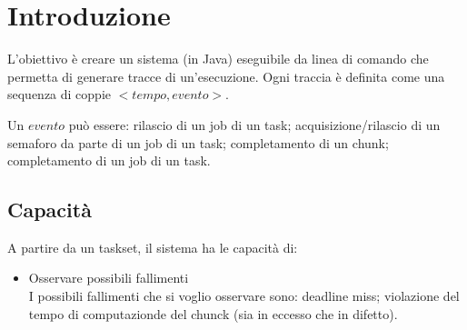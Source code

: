 \chapter{Introduzione}
L'obiettivo è creare un sistema (in Java) eseguibile da linea di comando che permetta di generare tracce di un'esecuzione. Ogni traccia è definita come una sequenza di coppie $<tempo, evento>$.

Un $evento$ può essere: rilascio di un job di un task; acquisizione/rilascio di un semaforo da parte di un job di un task; completamento di un chunk; completamento di un job di un task.

\section{Capacità}
A partire da un taskset, il sistema ha le capacità di:
\begin{itemize}
    \item Osservare possibili fallimenti \\
        I possibili fallimenti che si voglio osservare sono: deadline miss; violazione del tempo di computazionde del chunck (sia in eccesso che in difetto).
\end{itemize}
